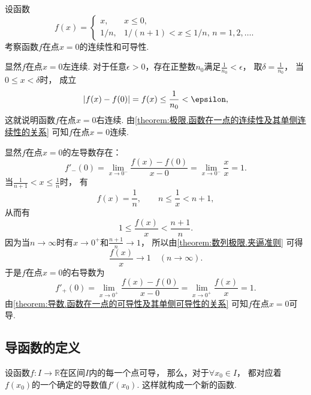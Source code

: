 \begin{example}
设函数\begin{equation*}
	f(x) = \left\{ \begin{array}{cl}
		x, & x\leq0, \\
		1/n, & 1/(n+1)<x\leq1/n,\,n=1,2,\dotsc.
	\end{array} \right.
\end{equation*}
考察函数\(f\)在点\(x=0\)的连续性和可导性.
\begin{solution}
显然\(f\)在点\(x=0\)左连续.
对于任意\(\epsilon>0\)，存在正整数\(n_0\)满足\(\frac1{n_0}<\epsilon\)，
取\(\delta=\frac1{n_0}\)，
当\(0 \leq x < \delta\)时，
成立\begin{equation*}
	\abs{f(x) - f(0)}
	= f(x)
	\leq \frac1{n_0}
	< \epsilon,
\end{equation*}
这就说明函数\(f\)在点\(x=0\)右连续.
由\cref{theorem:极限.函数在一点的连续性及其单侧连续性的关系} 可知\(f\)在点\(x=0\)连续.

显然\(f\)在点\(x=0\)的左导数存在：\begin{equation*}
	f'_-(0) = \lim_{x\to0^-} \frac{f(x) - f(0)}{x - 0}
	= \lim_{x\to0^-} \frac{x}{x}
	= 1.
\end{equation*}
当\(\frac1{n+1} < x \leq \frac1n\)时，
有\begin{equation*}
	f(x) = \frac1n,
	\qquad
	n \leq \frac1x < n+1,
\end{equation*}
从而有\begin{equation*}
	1 \leq \frac{f(x)}{x} < \frac{n+1}{n}.
\end{equation*}
因为当\(n\to\infty\)时有\(x\to0^+\)和\(\frac{n+1}{n}\to1\)，
所以由\cref{theorem:数列极限.夹逼准则} 可得\begin{equation*}
	\frac{f(x)}{x} \to 1
	\quad(n\to\infty).
\end{equation*}
于是\(f\)在点\(x=0\)的右导数为\begin{equation*}
	f'_+(0) = \lim_{x\to0^+} \frac{f(x) - f(0)}{x - 0}
	= \lim_{x\to0^+} \frac{f(x)}{x}
	= 1.
\end{equation*}
由\cref{theorem:导数.函数在一点的可导性及其单侧可导性的关系} 可知\(f\)在点\(x=0\)可导.
\end{solution}
\end{example}

\subsection{导函数的定义}
设函数\(f\colon I\to\mathbb{R}\)在区间\(I\)内的每一个点可导，
那么，对于\(\forall x_0 \in I\)，
都对应着\(f(x_0)\)的一个确定的导数值\(f'(x_0)\).
这样就构成一个新的函数.

